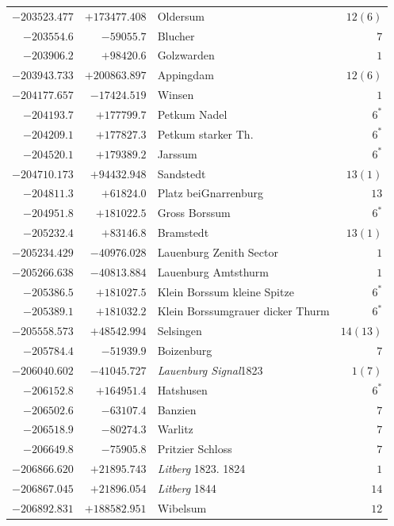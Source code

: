 \begin{center}
\begin{tabular}{r|r|p{170pt}|r}
\(-203523.477\)&\(+173477.408\)&Oldersum&\(12 (6)\)\\
\(-203554.6\)&\(-59055.7\)&Blucher&\(7\)\\
\(-203906.2\)&\(+98420.6\)&Golzwarden&\(1\)\\
\(-203943.733\)&\(+200863.897\)&Appingdam&\(12 (6)\)\\
\(-204177.657\)&\(-17424.519\)&Winsen&\(1\)\\
\(-204193.7\)&\(+177799.7\)&Petkum Nadel&\(6^{*}\)\\
\(-204209.1\)&\(+177827.3\)&Petkum starker Th.&\(6^{*}\)\\
\(-204520.1\)&\(+179389.2\)&Jarssum&\(6^{*}\)\\
\(-204710.173\)&\(+94432.948\)&Sandstedt&\(13 (1)\)\\
\(-204811.3\)&\(+61824.0\)&Platz beiGnarrenburg&\(13\)\\
\(-204951.8\)&\(+181022.5\)&Gross Borssum&\(6^{*}\)\\
\(-205232.4\)&\(+83146.8\)&Bramstedt&\(13 (1)\)\\
\(-205234.429\)&\(-40976.028\)&Lauenburg Zenith Sector&\(1\)\\
\(-205266.638\)&\(-40813.884\)&Lauenburg Amtsthurm&\(1\)\\
\(-205386.5\)&\(+181027.5\)&Klein Borssum kleine Spitze&\(6^{*}\)\\
\(-205389.1\)&\(+181032.2\)&Klein Borssumgrauer dicker Thurm&\(6^{*}\)\\
\(-205558.573\)&\(+48542.994\)&Selsingen&\(14(13)\)\\
\(-205784.4\)&\(-51939.9\)&Boizenburg&\(7\)\\
\(-206040.602\)&\(-41045.727\)&\textit{Lauenburg Signal}1823&\(1 (7)\)\\
\(-206152.8\)&\(+164951.4\)&Hatshusen&\(6^{*}\)\\
\(-206502.6\)&\(-63107.4\)&Banzien&\(7\)\\
\(-206518.9\)&\(-80274.3\)&Warlitz&\(7\)\\
\(-206649.8\)&\(-75905.8\)&Pritzier Schloss&\(7\)\\
\(-206866.620\)&\(+21895.743\)&\textit{Litberg} 1823. 1824&\(1\)\\
\(-206867.045\)&\(+21896.054\)&\textit{Litberg} 1844&\(14\)\\
\(-206892.831\)&\(+188582.951\)&Wibelsum&\(12\)\\
\hline\end{tabular}\endgroup\end{center}
\clearpage
